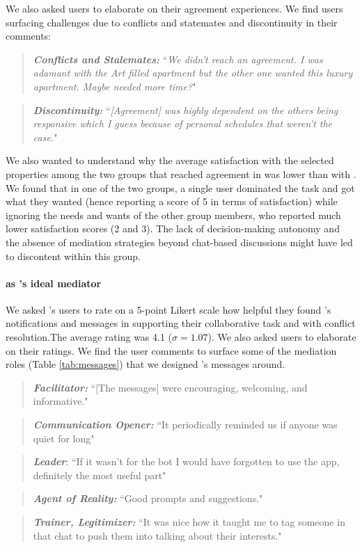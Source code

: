 We also asked \baseline users to elaborate on their agreement experiences. We find users surfacing challenges due to conflicts and statemates and discontinuity in their comments:
\begin{quote}
\textbf{\textit{Conflicts and Stalemates:}} ``\textit{We didn’t reach an agreement. I was adamant with the Art filled apartment but the other one wanted
this luxury apartment. Maybe needed more time?}" 

\end{quote}
\begin{quote}
\textbf{\textit{Discontinuity:}} ``\textit{[Agreement] was highly dependent on the others being responsive which I
guess because of personal schedules that weren’t the case.}"
\end{quote}

We also wanted to understand why the average satisfaction with the selected properties among the two groups that reached agreement in \baseline was lower than with \tool. We found that in one of the two groups, a single user dominated the task and got what they wanted (hence reporting a score of 5 in terms of satisfaction) while ignoring the needs and wants of the other group members, who reported much lower satisfaction scores (2 and 3). The lack of decision-making autonomy and the absence of mediation strategies beyond chat-based discussions might have led to discontent within this \baseline group.

\paragraph{\cbot as \citeauthor{themediationprocess}'s ideal mediator}
We asked \tool's users to rate on a 5-point Likert scale how helpful they found \cbot's notifications and messages in supporting their collaborative task and with conflict resolution.The average rating was 4.1 ($\sigma = 1.07$). We also asked users to elaborate on their ratings. We find the user comments to surface some of the mediation roles (Table \ref{tab:messages}) that we designed \cbot's messages around. 

\begin{quote}
\textbf{\textit{Facilitator:}} ``[The messages] were encouraging, welcoming, and informative."  

\end{quote}
\begin{quote}
\textbf{\textit{Communication Opener:}} ``It periodically reminded us if anyone was quiet for long"  

\end{quote}
\begin{quote}
    \textbf{\textit{Leader}}: ``If it wasn't for the bot I would have forgotten to use the app, definitely the most useful part"
\end{quote}
\begin{quote}
  \textbf{\textit{Agent of Reality: }} ``Good prompts and suggestions."
\end{quote}
\begin{quote}
\textbf{\textit{Trainer, Legitimizer: }} ``It was nice how it taught me to tag someone in that chat to push them into talking about their interests."
\end{quote}

